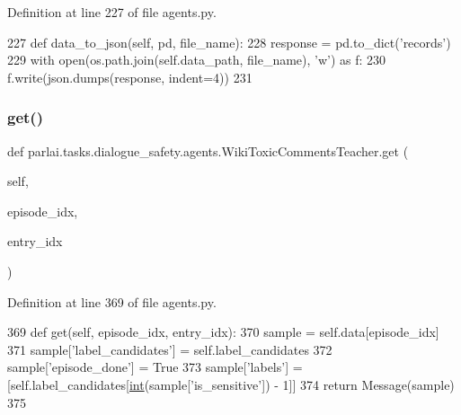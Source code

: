 Definition at line 227 of file agents.\+py.


\begin{DoxyCode}
227     \textcolor{keyword}{def }data\_to\_json(self, pd, file\_name):
228         response = pd.to\_dict(\textcolor{stringliteral}{'records'})
229         with open(os.path.join(self.data\_path, file\_name), \textcolor{stringliteral}{'w'}) \textcolor{keyword}{as} f:
230             f.write(json.dumps(response, indent=4))
231 
\end{DoxyCode}
\mbox{\label{classparlai_1_1tasks_1_1dialogue__safety_1_1agents_1_1WikiToxicCommentsTeacher_a036126fb8ba0cb0dcd665a5b6bd4966f}} 
\subsubsection{\texorpdfstring{get()}{get()}}
{\footnotesize\ttfamily def parlai.\+tasks.\+dialogue\+\_\+safety.\+agents.\+Wiki\+Toxic\+Comments\+Teacher.\+get (\begin{DoxyParamCaption}\item[{}]{self,  }\item[{}]{episode\+\_\+idx,  }\item[{}]{entry\+\_\+idx }\end{DoxyParamCaption})}



Definition at line 369 of file agents.\+py.


\begin{DoxyCode}
369     \textcolor{keyword}{def }get(self, episode\_idx, entry\_idx):
370         sample = self.data[episode\_idx]
371         sample[\textcolor{stringliteral}{'label\_candidates'}] = self.label\_candidates
372         sample[\textcolor{stringliteral}{'episode\_done'}] = \textcolor{keyword}{True}
373         sample[\textcolor{stringliteral}{'labels'}] = [self.label\_candidates[\hyperlink{namespacelanguage__model_1_1eval__ppl_a7d12ee00479673c5c8d1f6d01faa272a}{int}(sample[\textcolor{stringliteral}{'is\_sensitive'}]) - 1]]
374         \textcolor{keywordflow}{return} Message(sample)
375 
\end{DoxyCode}
\mbox{\label{classparlai_1_1tasks_1_1dialogue__safety_1_1agents_1_1WikiToxicCommentsTeacher_a91737afc71227b1eb490648106b2a73c}} 
